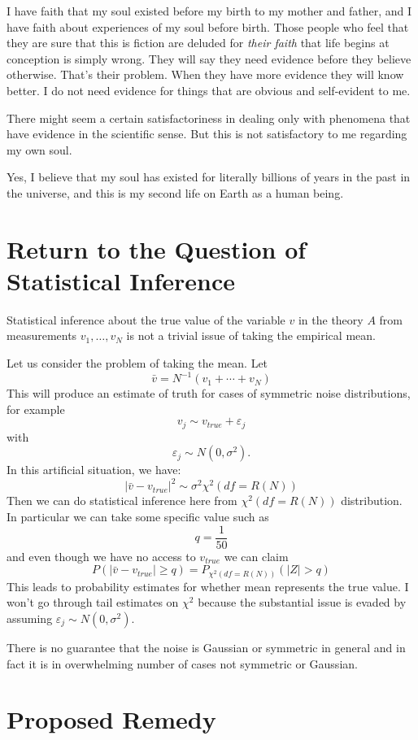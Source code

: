 \documentclass{amsart}
\begin{document}
I have faith that my soul existed before my birth to my mother and father, and I have faith about experiences of my soul before birth.  Those people who feel that they are sure that this is fiction are deluded for {\em their faith} that life begins at conception is simply wrong.  They will say they need evidence before they believe otherwise.  That's their problem.  When they have more evidence they will know better.  I do not need evidence for things that are obvious and self-evident to me.

There might seem a certain satisfactoriness in dealing only with phenomena that have evidence in the scientific sense.  But this is not satisfactory to me regarding my own soul.

Yes, I believe that my soul has existed for literally billions of years in the past in the universe, and this is my second life on Earth as a human being.

\section{Return to the Question of Statistical Inference}

Statistical inference about the true value of the variable $v$ in the theory $A$ from measurements $v_1,\dots,v_N$ is not a trivial issue of taking the empirical mean.

Let us consider the problem of taking the mean.  Let
\[
\bar{v} = N^{-1}(v_1 + \cdots + v_N)
\]
This will produce an estimate of truth for cases of symmetric noise distributions, for example
\[
v_j \sim v_{true} + \varepsilon_j
\]
with
\[
\varepsilon_j \sim N( 0, \sigma^2).
\]
In this artificial situation, we have:
\[
| \bar{v} - v_{true} |^2 \sim \sigma^2 \chi^2(df = R(N))
\]
Then we can do statistical inference here from $\chi^2(df=R(N))$ distribution. In particular we can take some specific value such as 
\[
q = \frac{1}{50}
\]
and even though we have no access to $v_{true}$ we can claim
\[
P( |\bar{v} - v_{true} | \ge q ) = P_{\chi^2(df=R(N))} ( |Z| > q )
\]
This leads to probability estimates for whether mean represents the true value.  I won't go through tail estimates on $\chi^2$ because the  substantial issue is evaded by assuming $\varepsilon_j \sim N(0, \sigma^2)$.

There is no guarantee that the noise is Gaussian or symmetric in general and in fact it is in overwhelming number of cases not symmetric or Gaussian.

\section{Proposed Remedy}
\end{document}

